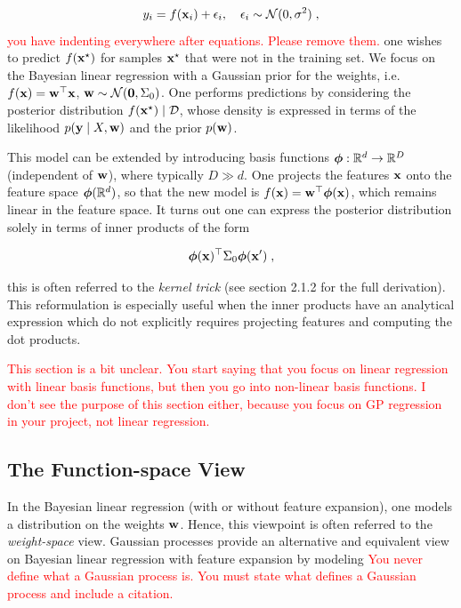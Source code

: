 \documentclass{article}
\begin{document}
\begin{equation} \label{eq:measurement_model}
    y_i = f(\boldsymbol{\mathbf{x}}_i) + \epsilon_i, \quad \epsilon_i \sim \mathcal N(0, \sigma^2) \; ,
\end{equation}
\textcolor{red}{you have indenting everywhere after equations. Please remove them.}
%
one wishes to predict $f(\boldsymbol{\mathbf{x}}^\star)$ for samples $\boldsymbol{\mathbf{x}}^\star$ that were not in the training set. We focus on the Bayesian linear regression with a Gaussian prior for the weights, i.e. $f(\boldsymbol{\mathbf{x}}) = \boldsymbol{\mathbf{w}}^\top \boldsymbol{\mathbf{x}}$, $\boldsymbol{\mathbf{w}} \sim \mathcal N(\boldsymbol{\mathbf{0}}, \Sigma_0)$. One performs predictions by considering the posterior distribution $f (\boldsymbol{\mathbf{x}}^\star) \mid \mathcal D$, whose density is expressed in terms of the likelihood $p(\boldsymbol{\mathbf{y}} \mid X, \boldsymbol{\mathbf{w}})$ and the prior $ p(\boldsymbol{\mathbf{w}})$.

This model can be extended by introducing basis functions $\boldsymbol{\mathbf{\phi}} : \mathbb R^d \to \mathbb R^D$ (independent of $\boldsymbol{\mathbf{w}}$), where typically $D \gg d$. One projects the features $\boldsymbol{\mathbf{x}}$ onto the feature space $\boldsymbol{\mathbf{\phi}}(\mathbb R^d)$, so that the new model is $f(\boldsymbol{\mathbf{x}}) = \boldsymbol{\mathbf{w}}^\top \boldsymbol{\mathbf{\phi}}(\boldsymbol{\mathbf{x}})$, which remains linear in the feature space. It turns out one can express the posterior distribution solely in terms of inner products of the form

\begin{equation} \label{eq:kernel_trick}
    \boldsymbol{\mathbf{\phi}}(\boldsymbol{\mathbf{x}})^\top \Sigma_0 \boldsymbol{\mathbf{\phi}}(\boldsymbol{\mathbf{x}}') \;,
\end{equation}

this is often referred to the \emph{kernel trick} (see \cite{rasmussen_gaussian_2005} section 2.1.2 for the full derivation). This reformulation is especially useful when the inner products have an analytical expression which do not explicitly requires projecting features and computing the dot products. 

\textcolor{red}{This section is a bit unclear. You start saying that you focus on linear regression with linear basis functions, but then you go into non-linear basis functions. I don't see the purpose of this section either, because you focus on GP regression in your project, not linear regression. }


\subsection{The Function-space View}

In the Bayesian linear regression (with or without feature expansion), one models a distribution on the weights $\boldsymbol{\mathbf{w}}$. Hence, this viewpoint is often referred to the \emph{weight-space} view. Gaussian processes provide an alternative and equivalent view on Bayesian linear regression with feature expansion by modeling \textcolor{red}{You never define what a Gaussian process is. You must state what defines a Gaussian process and include a citation. }
\end{document}
